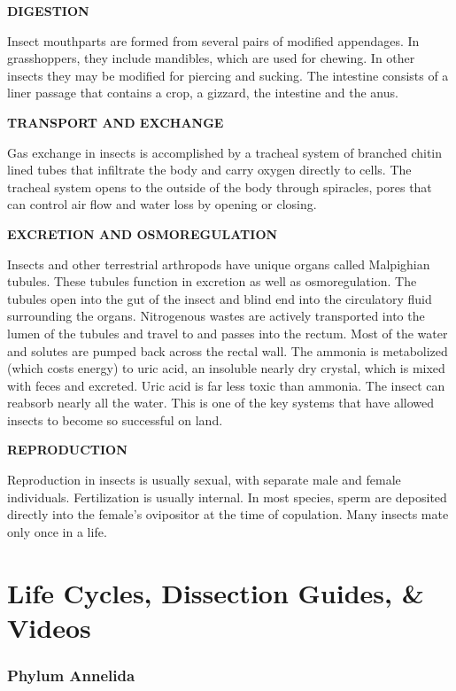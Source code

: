 \documentclass[
]{book}
\begin{document}
\textbf{DIGESTION}

Insect mouthparts are formed from several pairs of modified appendages. In grasshoppers, they include mandibles, which are used for chewing. In other insects they may be modified for piercing and sucking. The intestine consists of a liner passage that contains a crop, a gizzard, the intestine and the anus.

\textbf{TRANSPORT AND EXCHANGE}

Gas exchange in insects is accomplished by a tracheal system of branched chitin lined tubes that infiltrate the body and carry oxygen directly to cells. The tracheal system opens to the outside of the body through spiracles, pores that can control air flow and water loss by opening or closing.

\textbf{EXCRETION AND OSMOREGULATION}

Insects and other terrestrial arthropods have unique organs called Malpighian tubules. These tubules function in excretion as well as osmoregulation. The tubules open into the gut of the insect and blind end into the circulatory fluid surrounding the organs. Nitrogenous wastes are actively transported into the lumen of the tubules and travel to and passes into the rectum. Most of the water and solutes are pumped back across the rectal wall. The ammonia is metabolized (which costs energy) to uric acid, an insoluble nearly dry crystal, which is mixed with feces and excreted. Uric acid is far less toxic than ammonia. The insect can reabsorb nearly all the water. This is one of the key systems that have allowed insects to become so successful on land.

\textbf{REPRODUCTION}

Reproduction in insects is usually sexual, with separate male and female individuals. Fertilization
is usually internal. In most species, sperm are deposited directly into the female's ovipositor at
the time of copulation. Many insects mate only once in a life.

\hypertarget{life-cycles-dissection-guides-videos}{%
\chapter*{Life Cycles, Dissection Guides, \& Videos}\label{life-cycles-dissection-guides-videos}}

\hypertarget{phylum-annelida-1}{%
\subsection*{Phylum Annelida}\label{phylum-annelida-1}}
\end{document}
